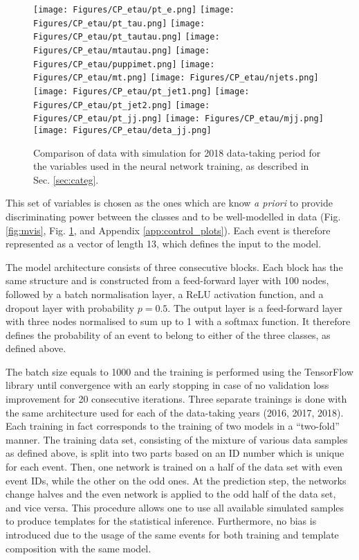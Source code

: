 \begin{figure}[t!]
    \centering
    \texttt{[image: Figures/CP\_etau/pt\_e.png]}
    \texttt{[image: Figures/CP\_etau/pt\_tau.png]}
    \texttt{[image: Figures/CP\_etau/pt\_tautau.png]}
    \texttt{[image: Figures/CP\_etau/mtautau.png]}
    \texttt{[image: Figures/CP\_etau/puppimet.png]}
    \texttt{[image: Figures/CP\_etau/mt.png]}
    \texttt{[image: Figures/CP\_etau/njets.png]}
    \texttt{[image: Figures/CP\_etau/pt\_jet1.png]}
    \texttt{[image: Figures/CP\_etau/pt\_jet2.png]}
    \texttt{[image: Figures/CP\_etau/pt\_jj.png]}
    \texttt{[image: Figures/CP\_etau/mjj.png]}
    \texttt{[image: Figures/CP\_etau/deta\_jj.png]}
    \caption{Comparison of data with simulation for 2018 data-taking period for the variables used in the neural network training, as described in Sec. \ref{sec:categ}.}
    \label{fig:nn_vars}
\end{figure}

This set of variables is chosen as the ones which are know \textit{a priori} to provide discriminating power between the classes and to be well-modelled in data (Fig. \ref{fig:mvis}, Fig. \ref{fig:nn_vars}, and Appendix \ref{app:control_plots}). Each event is therefore represented as a vector of length 13, which defines the input to the model.

The model architecture consists of three consecutive blocks. Each block has the same structure and is constructed from a feed-forward layer with 100 nodes, followed by a batch normalisation layer, a ReLU activation function, and a dropout layer with probability $p=0.5$. The output layer is a feed-forward layer with three nodes normalised to sum up to 1 with a softmax function. It therefore defines the probability of an event to belong to either of the three classes, as defined above.

The batch size equals to 1000 and the training is performed using the TensorFlow library \cite{tensorflow2015-whitepaper} until convergence with an early stopping in case of no validation loss improvement for 20 consecutive iterations. Three separate trainings is done with the same architecture used for each of the data-taking years (2016, 2017, 2018). Each training in fact corresponds to the training of two models in a \enquote{two-fold} manner. The training data set, consisting of the mixture of various data samples as defined above, is split into two parts based on an ID number which is unique for each event. Then, one network is trained on a half of the data set with even event IDs, while the other on the odd ones. At the prediction step, the networks change halves and the even network is applied to the odd half of the data set, and vice versa. This procedure allows one to use all available simulated samples to produce templates for the statistical inference. Furthermore, no bias is introduced due to the usage of the same events for both training and template composition with the same model.  

